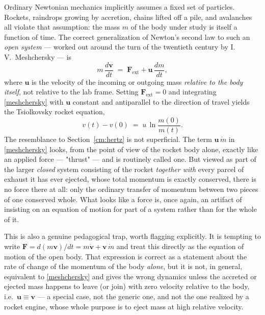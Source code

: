 Ordinary Newtonian mechanics implicitly assumes a fixed set of
particles. Rockets, raindrops growing by accretion, chains lifted
off a pile, and avalanches all violate that assumption: the mass $m$
of the body under study is itself a function of time. The correct
generalization of Newton's second law to such an \emph{open system}
--- worked out around the turn of the twentieth century by
I.\,V.\ Meshchersky --- is
\begin{equation}
  m\,\frac{d\mathbf v}{dt} \;=\; \mathbf F_{\mathrm{ext}}
  + \mathbf u\,\frac{dm}{dt} ,
  \label{meshchersky}
\end{equation}
where $\mathbf u$ is the velocity of the incoming or outgoing mass
\emph{relative to the body itself}, not relative to the lab frame.
Setting $\mathbf F_{\mathrm{ext}}=0$ and integrating
\eqref{meshchersky} with $\mathbf u$ constant and antiparallel to
the direction of travel yields the Tsiolkovsky rocket equation,
\begin{equation}
  v(t) - v(0) \;=\; u\,\ln\frac{m(0)}{m(t)} .
  \label{tsiolkovsky}
\end{equation}
The resemblance to Section~\ref{cm:hertz} is not superficial. The
term $\mathbf u\,\dot m$ in \eqref{meshchersky} looks, from the
point of view of the rocket body alone, exactly like an applied
force --- "thrust" --- and is routinely called one. But viewed as
part of the larger \emph{closed} system consisting of the rocket
\emph{together with} every parcel of exhaust it has ever ejected,
whose total momentum is exactly conserved, there is no force there
at all: only the ordinary transfer of momentum between two pieces of
one conserved whole. What looks like a force is, once again, an
artifact of insisting on an equation of motion for part of a system
rather than for the whole of it.

This is also a genuine pedagogical trap, worth flagging explicitly.
It is tempting to write $\mathbf F = d(m\mathbf v)/dt = m\dot{\mathbf
v} + \mathbf v\,\dot m$ and treat this directly as the equation of
motion of the open body. That expression is correct as a statement
about the rate of change of the momentum of the body \emph{alone},
but it is not, in general, equivalent to \eqref{meshchersky} and
gives the wrong dynamics unless the accreted or ejected mass happens
to leave (or join) with zero velocity relative to the body, i.e.\
$\mathbf u \equiv \mathbf v$ --- a special case, not the generic one,
and not the one realized by a rocket engine, whose whole purpose is
to eject mass at high relative velocity.


